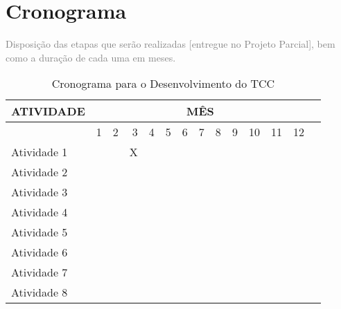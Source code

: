 \documentclass[12pt]{article}
\begin{document}
\section{Cronograma}
\textcolor{gray}{Disposição das etapas que serão realizadas [entregue no Projeto Parcial], bem como a duração de cada uma em meses.} 

\begin{table}[!htp]\centering
\caption{Cronograma para o Desenvolvimento do TCC}\label{tab: }
\scriptsize
\begin{tabular}{lr|r|r|r|r|r|r|r|r|r|r|rr}\toprule
\multirow{2}{*}{\textbf{ATIVIDADE}} &\multicolumn{12}{c}{\textbf{MÊS}} \\\midrule
&1 &2 &3 &4 &5 &6 &7 &8 &9 &10 &11 &12 \\
Atividade 1 & & & X & & & & & & & \\
Atividade 2 & & & & & & & & & & & \\
Atividade 3 & & & & & & & & & & & \\
Atividade 4 & & & & & & & & & & & \\
Atividade 5 & & & & & & & & & & & \\
Atividade 6 & & & & & & & & & & & \\
Atividade 7 & & & & & & & & & & & \\
Atividade 8 & & & & & & & & & & & \\
\bottomrule
\end{tabular}
\end{table}


\def\refname{Referências Bibliográficas}

\end{document}
